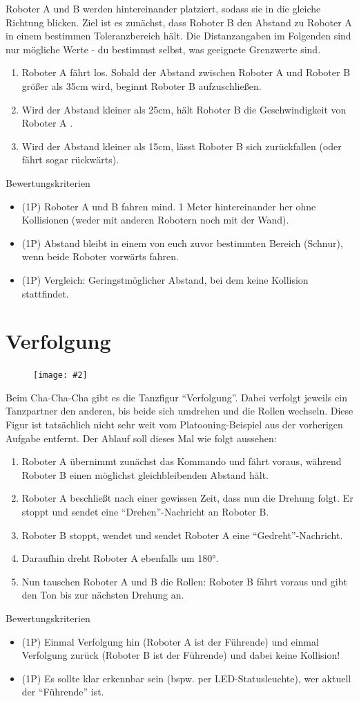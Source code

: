 \documentclass[
	12pt,
	article,
	type=bsc, %
	colorbacktitle,
	instlogo,
	accentcolor=tud1c,
	german,
	twoside
]{tudexercise}
\newcommand{\easygcenter}[2]{
	\begin{figure}[h]
	\centering 
	\texttt{[image: \#2]}
	\end{figure}
}
\begin{document}
Roboter A und B werden hintereinander platziert, sodass sie in die gleiche Richtung blicken. Ziel ist es zunächst, dass Roboter B den Abstand zu Roboter A in einem bestimmen Toleranzbereich hält. Die Distanzangaben im Folgenden sind nur mögliche Werte - du bestimmst selbst, was geeignete Grenzwerte sind.
\begin{enumerate}
\item Roboter A fährt los. Sobald der Abstand zwischen Roboter A und Roboter B größer als 35cm wird, beginnt Roboter B aufzuschließen.
\item Wird der Abstand kleiner als 25cm, hält Roboter B die Geschwindigkeit von Roboter A .
\item Wird der Abstand kleiner als 15cm, lässt Roboter B sich zurückfallen (oder fährt sogar rückwärts).
\end{enumerate}
Bewertungskriterien
\begin{itemize}
\item (1P) Roboter A und B fahren mind. 1 Meter hintereinander her ohne Kollisionen (weder mit anderen Robotern noch mit der Wand).
\item (1P) Abstand bleibt in einem von euch zuvor bestimmten Bereich (Schnur), wenn beide Roboter vorwärts fahren.
\item (1P) Vergleich: Geringstmöglicher Abstand, bei dem keine Kollision stattfindet.
\end{itemize}

\newpage
\section{Verfolgung}
\easygcenter{.8\textwidth}{img/chachacha.png}
Beim Cha-Cha-Cha gibt es die Tanzfigur “Verfolgung”. Dabei verfolgt jeweils ein Tanzpartner den anderen, bis beide sich umdrehen und die Rollen wechseln. Diese Figur ist tatsächlich nicht sehr weit vom Platooning-Beispiel aus der vorherigen Aufgabe entfernt.
Der Ablauf soll dieses Mal wie folgt aussehen:
\begin{enumerate}
\item  Roboter A übernimmt zunächst das Kommando und fährt voraus, während Roboter B einen möglichst gleichbleibenden Abstand hält.
\item  Roboter A beschließt nach einer gewissen Zeit, dass nun die Drehung folgt. Er stoppt und sendet eine “Drehen”-Nachricht an Roboter B.
\item  Roboter B stoppt, wendet und sendet Roboter A eine “Gedreht”-Nachricht.
\item  Daraufhin dreht Roboter A ebenfalls um 180°.
\item  Nun tauschen Roboter A und B die Rollen: Roboter B fährt voraus und gibt den Ton bis zur nächsten Drehung an.
\end{enumerate}
Bewertungskriterien
\begin{itemize}
\item (1P) Einmal Verfolgung hin (Roboter A ist der Führende) und einmal Verfolgung zurück (Roboter B ist der Führende) und dabei keine Kollision!
\item (1P) Es sollte klar erkennbar sein (bspw. per LED-Statusleuchte), wer aktuell der “Führende” ist.
\end{itemize}
\end{document}
